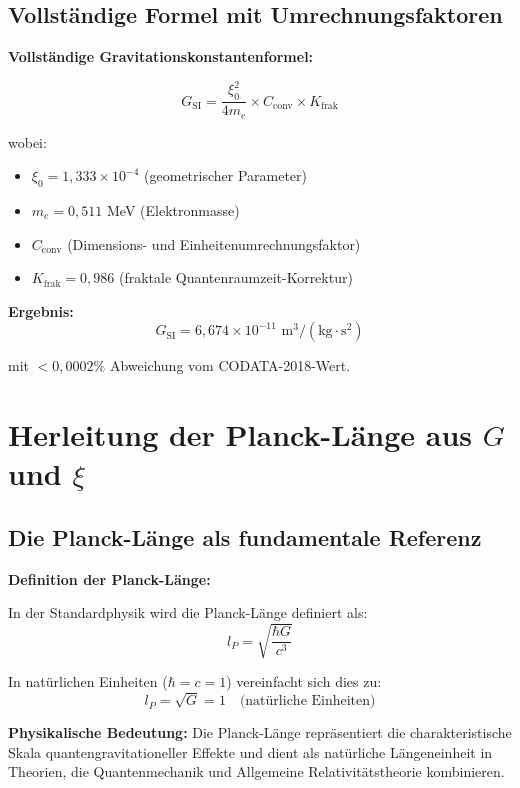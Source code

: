 \documentclass[12pt,a4paper]{article}
\begin{document}
	\subsection{Vollst{\"a}ndige Formel mit Umrechnungsfaktoren}
	
	\begin{keyresult}
		\textbf{Vollst{\"a}ndige Gravitationskonstantenformel:}
		
		\begin{equation}
			\boxed{G_{\text{SI}} = \frac{\xi_0^2}{4 m_e} \times C_{\text{conv}} \times K_{\text{frak}}}
			\label{eq:G_complete}
		\end{equation}
		
		wobei:
		\begin{itemize}
			\item $\xi_0 = 1{,}333 \times 10^{-4}$ (geometrischer Parameter)
			\item $m_e = 0{,}511$ MeV (Elektronmasse)
			\item $C_{\text{conv}}$ (Dimensions- und Einheitenumrechnungsfaktor)
			\item $K_{\text{frak}} = 0{,}986$ (fraktale Quantenraumzeit-Korrektur)
		\end{itemize}
		
		\textbf{Ergebnis:}
		\begin{equation}
			G_{\text{SI}} = 6{,}674 \times 10^{-11} \text{ m}^3/(\text{kg}\cdot\text{s}^2)
		\end{equation}
		
		mit $<0{,}0002\%$ Abweichung vom CODATA-2018-Wert.
	\end{keyresult}
	
	\section{Herleitung der Planck-L{\"a}nge aus $G$ und $\xi$}
	
	\subsection{Die Planck-L{\"a}nge als fundamentale Referenz}
	
	\begin{derivation}
		\textbf{Definition der Planck-L{\"a}nge:}
		
		In der Standardphysik wird die Planck-L{\"a}nge definiert als:
		\begin{equation}
			l_P = \sqrt{\frac{\hbar G}{c^3}}
			\label{eq:planck_length_standard}
		\end{equation}
		
		In nat{\"u}rlichen Einheiten ($\hbar = c = 1$) vereinfacht sich dies zu:
		\begin{equation}
			\boxed{l_P = \sqrt{G} = 1 \quad \text{(nat{\"u}rliche Einheiten)}}
			\label{eq:planck_natural}
		\end{equation}
		
		\textbf{Physikalische Bedeutung:} Die Planck-L{\"a}nge repr{\"a}sentiert die charakteristische Skala quantengravitationeller Effekte und dient als nat{\"u}rliche L{\"a}ngeneinheit in Theorien, die Quantenmechanik und Allgemeine Relativit{\"a}tstheorie kombinieren.
	\end{derivation}
	
\end{document}
